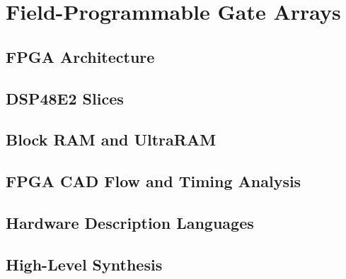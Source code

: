 \section{Field-Programmable Gate Arrays}
\label{sec:fpga}

\subsection{FPGA Architecture}
\label{sec:fpga-arch}

\subsection{DSP48E2 Slices}
\label{sec:dsp48}

\subsection{Block RAM and UltraRAM}
\label{sec:bram-uram}

\subsection{FPGA CAD Flow and Timing Analysis}
\label{sec:cad-flow}

\subsection{Hardware Description Languages}
\label{sec:hdl}

\subsection{High-Level Synthesis}
\label{sec:hls}

